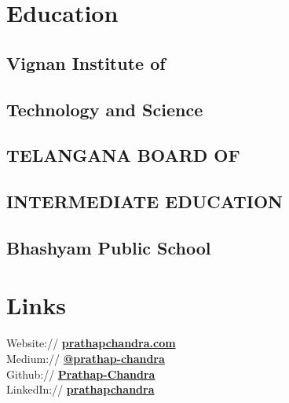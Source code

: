 \documentclass{deedy-resume-openfont}
\begin{document}
%
%
\lastupdated

%
%

%
%

\begin{minipage}[t]{0.33\textwidth} 


\section{Education} 
\subsection{Vignan Institute of}
\subsection{Technology and Science}
\sectionsep

\subsection{TELANGANA BOARD OF}
\subsection{INTERMEDIATE EDUCATION}
\sectionsep

\subsection{Bhashyam Public School}
\sectionsep


\section{Links} 
Website://  \href{https://www.prathapchandra.com/}{\bf prathapchandra.com} \\
Medium:// \href{https://medium.com/@prathap-chandra/}{\bf @prathap-chandra} \\
Github:// \href{https://github.com/Prathap-Chandra}{\bf Prathap-Chandra} \\
LinkedIn://  \href{https://www.linkedin.com/in/prathapchandra}{\bf prathapchandra} \\


\end{minipage}
\end{document}
